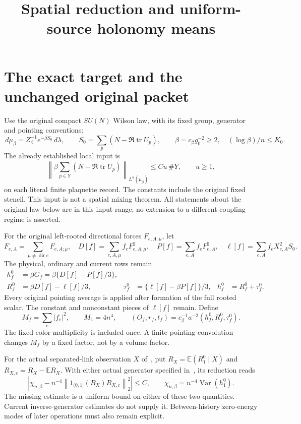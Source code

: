 \documentclass[11pt,letterpaper]{article}
\title{Spatial reduction and uniform-source holonomy means}\author{}\date{}
\theoremstyle{remark}\newtheorem{remark}[theorem]{Remark}
\newcommand{\E}{\mathbb E}
\newcommand{\Var}{\operatorname{Var}}\newcommand{\Cov}{\operatorname{Cov}}
\newcommand{\tr}{\operatorname{tr}}\newcommand{\Tr}{\operatorname{Tr}}
\newcommand{\cB}{c_\beta}\newcommand{\dd}{\,d}
\newcommand{\norm}[1]{\left\lVert#1\right\rVert}
\begin{document}
\maketitle
\section{The exact target and the unchanged original packet}

Use the original compact \(SU(N)\) Wilson law, with its fixed group, generator and pointing conventions:
\begin{equation}\label{eq:law}
 \dd\mu_\beta=Z_\beta^{-1}e^{-\beta S_0}\dd\lambda,
 \qquad S_0=\sum_p(N-\Re\tr U_p),\qquad
 \beta=\cB g_0^{-2}\ge2,\quad (\log\beta)/n\le K_0.
\end{equation}
The already established local input is
\begin{equation}\label{eq:moment}
 \norm{\beta\sum_{p\in Y}(N-\Re\tr U_p)}_{L^u(\mu_\beta)}
 \le C u\,\#Y,\qquad u\ge1,
\end{equation}
on each literal finite plaquette record. The constants include the original fixed stencil. This input is not a spatial mixing theorem. All statements about the original law below are in this input range; no extension to a different coupling regime is asserted.

For the original left-rooted directional forces \(F_{e,A;\mu}\), let
\[
 F_{e,A}=\sum_{\mu\ne\operatorname{dir}e}F_{e,A;\mu},\quad
 D[f]=\sum_{e,A,\mu}f_e F_{e,A;\mu}^2,
 \quad P[f]=\sum_{e,A}f_eF_{e,A}^2,
 \quad \ell[f]=\sum_{e,A}f_eX_{e,A}^2S_0.
\]
The physical, ordinary and current rows remain
\begin{align}\label{eq:rows}
 h_f^0&=\beta G_f=\beta\{D[f]-P[f]/3\},\\
 R_f^0&=\beta D[f]-\ell[f]/3,
 &\tau_f^0&=\{\ell[f]-\beta P[f]\}/3,
 &h_f^0&=R_f^0+\tau_f^0.\nonumber
\end{align}
Every original pointing average is applied after formation of the full rooted scalar. The constant and nonconstant pieces of \(\ell[f]\) remain. Define
\begin{equation}\label{eq:normalization}
 M_f=\sum_e|f_e|^2,\qquad M_1=4n^4,
 \qquad (O_f,r_f,t_f)=\cB^{-1}a^{-2}(h_f^0,R_f^0,\tau_f^0).
\end{equation}
The fixed color multiplicity is included once. A finite pointing convolution changes \(M_f\) by a fixed factor, not by a volume factor.

For the actual separated-link observation \(X\) of~\cite[\S\S2--4]{SZ}, put
\(R_X=\E(R_1^0\mid X)\) and \(R_{X,c}=R_X-\E R_X\). With either actual generator specified in~\cite[\S2.2]{OS}, its reduction reads
\begin{equation}\label{eq:r15target}
 \left|\chi_{n,\beta}-n^{-4}\norm{1_{(0,1]}(B_X)R_{X,c}}_2^2\right|\le C,
 \qquad \chi_{n,\beta}=n^{-4}\Var(h_1^0).
\end{equation}
The missing estimate is a uniform bound on either of these two quantities. Current inverse-generator estimates do not supply it. Between-history zero-energy modes of later operations must also remain explicit.
\end{document}
